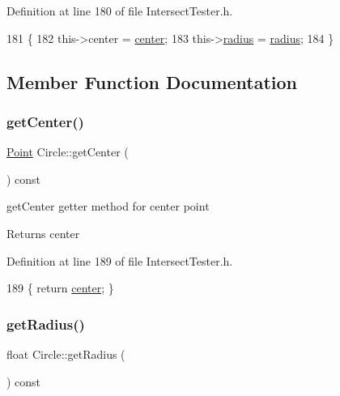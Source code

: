 Definition at line 180 of file Intersect\+Tester.\+h.


\begin{DoxyCode}
181     \{
182         this->center = \hyperlink{class_circle_a8c4026a5a34d2df1527f019dd456317b}{center};
183         this->\hyperlink{class_circle_a47644132ec8bec0f3a4e8d0e15bcd5d3}{radius} = \hyperlink{class_circle_a47644132ec8bec0f3a4e8d0e15bcd5d3}{radius};
184     \}
\end{DoxyCode}


\subsection{Member Function Documentation}
\mbox{\label{class_circle_a9818ca0bbac64ff447945a8e51ff9319}} 
\subsubsection{\texorpdfstring{get\+Center()}{getCenter()}}
{\footnotesize\ttfamily \hyperlink{class_point}{Point} Circle\+::get\+Center (\begin{DoxyParamCaption}{ }\end{DoxyParamCaption}) const\hspace{0.3cm}{\ttfamily [inline]}}



get\+Center getter method for center point 

\begin{DoxyReturn}{Returns}
center 
\end{DoxyReturn}


Definition at line 189 of file Intersect\+Tester.\+h.


\begin{DoxyCode}
189 \{ \textcolor{keywordflow}{return} \hyperlink{class_circle_a8c4026a5a34d2df1527f019dd456317b}{center}; \}
\end{DoxyCode}
\mbox{\label{class_circle_a95b7dc25d2e9b1e40a189cd83386a12e}} 
\subsubsection{\texorpdfstring{get\+Radius()}{getRadius()}}
{\footnotesize\ttfamily float Circle\+::get\+Radius (\begin{DoxyParamCaption}{ }\end{DoxyParamCaption}) const\hspace{0.3cm}{\ttfamily [inline]}}



